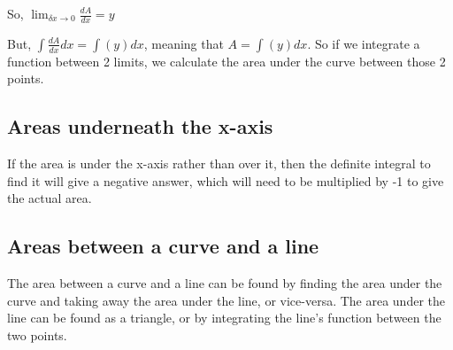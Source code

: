 So, $\lim_{\delta x \to 0} \frac{dA}{dx} = y$

But, $\int \frac{dA}{dx} dx = \int (y) dx$, meaning that $A = \int (y) dx$. So if we integrate a function between 2 limits, we calculate the area under the curve between those 2 points.

\subsection{Areas underneath the x-axis}
If the area is under the x-axis rather than over it, then the definite integral to find it will give a negative answer, which will need to be multiplied by -1 to give the actual area.

\subsection{Areas between a curve and a line}
The area between a curve and a line can be found by finding the area under the curve and taking away the area under the line, or vice-versa. The area under the line can be found as a triangle, or by integrating the line's function between the two points.
